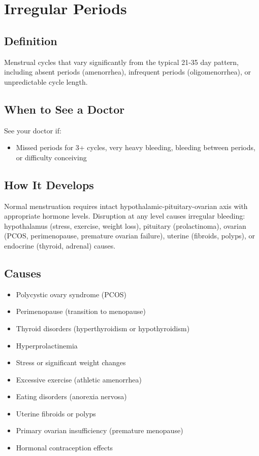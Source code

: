 \chapter{Irregular Periods}

\section*{Definition}
Menstrual cycles that vary significantly from the typical 21-35 day pattern, including absent periods (amenorrhea), infrequent periods (oligomenorrhea), or unpredictable cycle length.

\section*{When to See a Doctor}
See your doctor if:
\begin{itemize}
  \item Missed periods for 3+ cycles, very heavy bleeding, bleeding between periods, or difficulty conceiving
\end{itemize}

\section*{How It Develops}
Normal menstruation requires intact hypothalamic-pituitary-ovarian axis with appropriate hormone levels. Disruption at any level causes irregular bleeding: hypothalamus (stress, exercise, weight loss), pituitary (prolactinoma), ovarian (PCOS, perimenopause, premature ovarian failure), uterine (fibroids, polyps), or endocrine (thyroid, adrenal) causes.

\section*{Causes}
\begin{itemize}
  \item Polycystic ovary syndrome (PCOS)
  \item Perimenopause (transition to menopause)
  \item Thyroid disorders (hyperthyroidism or hypothyroidism)
  \item Hyperprolactinemia
  \item Stress or significant weight changes
  \item Excessive exercise (athletic amenorrhea)
  \item Eating disorders (anorexia nervosa)
  \item Uterine fibroids or polyps
  \item Primary ovarian insufficiency (premature menopause)
  \item Hormonal contraception effects
\end{itemize}

